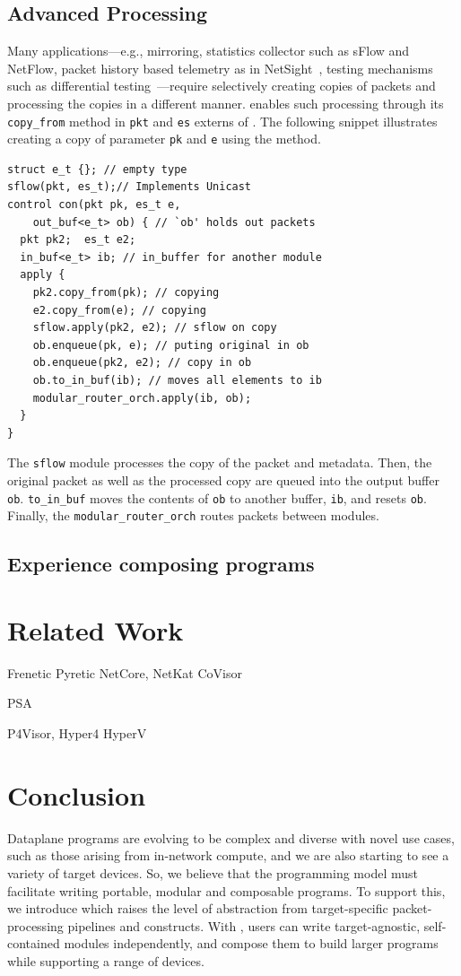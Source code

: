 \documentclass[letterpaper,twocolumn,10pt]{article}
\begin{document}
\subsection{Advanced Processing}
Many applications---e.g., mirroring, statistics collector such as
sFlow and NetFlow, packet history based telemetry as in
NetSight~\cite{179783}, testing mechanisms such as differential
testing~\cite{Zheng:2018:PLV:3281411.3281436}---require selectively
creating copies of packets and processing the copies in a different
manner. \ulang enables such processing through its \texttt{copy\_from}
method in \texttt{pkt} and \texttt{es} externs of \uarch. The
following snippet illustrates creating a copy of parameter \texttt{pk}
and \texttt{e} using the method.
\begin{lstlisting}[frame=none]
struct e_t {}; // empty type
sflow(pkt, es_t);// Implements Unicast 
control con(pkt pk, es_t e, 
    out_buf<e_t> ob) { // `ob' holds out packets
  pkt pk2;  es_t e2;
  in_buf<e_t> ib; // in_buffer for another module
  apply {
    pk2.copy_from(pk); // copying
    e2.copy_from(e); // copying
    sflow.apply(pk2, e2); // sflow on copy
    ob.enqueue(pk, e); // puting original in ob
    ob.enqueue(pk2, e2); // copy in ob
    ob.to_in_buf(ib); // moves all elements to ib
    modular_router_orch.apply(ib, ob);
  }
}
\end{lstlisting}
The \texttt{sflow} module processes the copy of the packet and
metadata.  Then, the original packet as well as the processed copy are
queued into the output buffer \texttt{ob}. \texttt{to\_in\_buf} moves
the contents of \texttt{ob} to another buffer, \texttt{ib}, and resets
\texttt{ob}. Finally, the \texttt{modular\_router\_orch} routes
packets between modules.

\subsection{Experience composing programs}


\section{Related Work}
\label{sec:related-work}
Frenetic Pyretic NetCore, NetKat CoVisor

PSA

P4Visor, Hyper4 HyperV

\section{Conclusion}
Dataplane programs are evolving to be complex and diverse with novel
use cases, such as those arising from in-network compute, and we are
also starting to see a variety of target devices. So, we believe that
the programming model must facilitate writing portable, modular and
composable programs. To support this, we introduce \ulang which raises
the level of abstraction from target-specific packet-processing
pipelines and constructs. With \ulang, users can write
target-agnostic, self-contained modules independently, and compose
them to build larger programs while supporting a range of devices.
\end{document}
